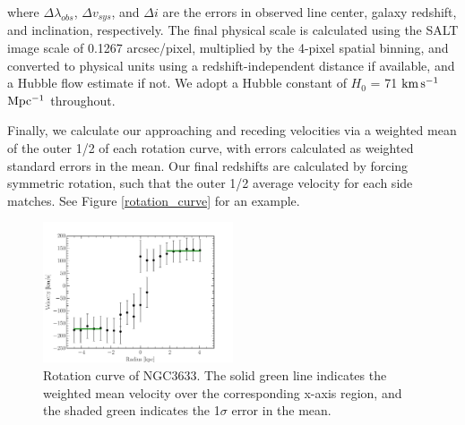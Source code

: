 \documentclass[iop]{emulateapj-rtx4}
\newcommand{\kms}{$\rm km\, s^{-1}$}
\begin{document}
\noindent where $\Delta \lambda_{obs}$, $\Delta v_{sys}$, and $\Delta i$ are the errors in observed line center, galaxy redshift, and inclination, respectively. The final physical scale is calculated using the SALT image scale of 0.1267 arcsec/pixel, multiplied by the 4-pixel spatial binning, and converted to physical units using a redshift-independent distance if available, and a Hubble flow estimate if not. We adopt a Hubble constant of $H_0$ = 71 \kms $\rm Mpc^{-1}$ throughout.

Finally, we calculate our approaching and receding velocities via a weighted mean of the outer 1/2 of each rotation curve, with errors calculated as weighted standard errors in the mean. Our final redshifts are calculated by forcing symmetric rotation, such that the outer 1/2 average velocity for each side matches. See Figure \ref{rotation_curve} for an example.

\begin{figure}[b!]
        \centering
        \vspace{0pt}
        \includegraphics[width=0.50\textwidth]{NGC3633_rotation_curve_xphys_helio_vemit.pdf}
        \caption{\small{Rotation curve of NGC3633. The solid green line indicates the weighted mean velocity over the corresponding x-axis region, and the shaded green indicates the 1$\sigma$ error in the mean.}}
        \label{completeness}
\end{figure}
\end{document}
